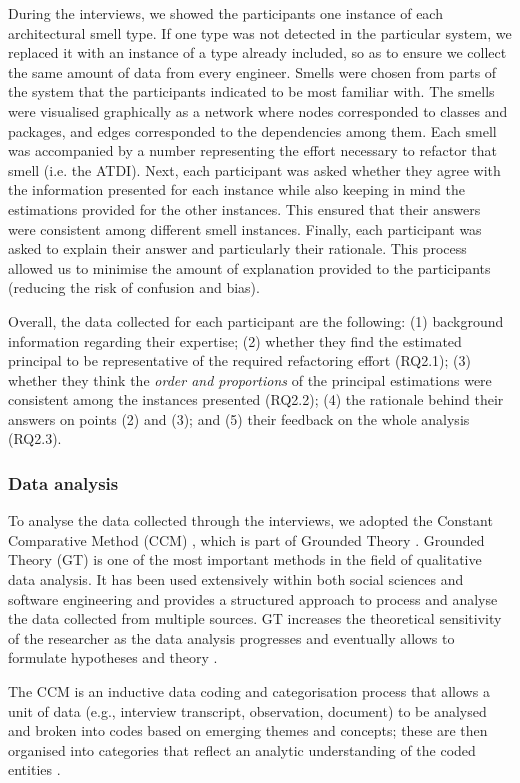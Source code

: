 During the interviews, we showed the participants one instance of each architectural smell type. If one type was not detected in the particular system, we replaced it with an instance of a type already included, so as to ensure we collect the same amount of data from every engineer. 
Smells were chosen from parts of the system that the participants indicated to be most familiar with.
The smells were visualised graphically as a network where nodes corresponded to classes and packages, and edges corresponded to the dependencies among them.
Each smell was accompanied by a number representing the effort necessary to refactor that smell (i.e. the ATDI).
Next, each participant was asked whether they agree with the information presented for each instance while also keeping in mind the estimations provided for the other instances.
This ensured that their answers were consistent among different smell instances.
Finally, each participant was asked to explain their answer and particularly their rationale.
This process allowed us to minimise the amount of explanation provided to the participants (reducing the risk of confusion and bias).

Overall, the data collected for each participant are the following: (1) background information regarding their expertise; (2) whether they find the estimated principal to be representative of the required refactoring effort (RQ2.1); (3) whether they think the \emph{order and proportions} of the principal estimations were consistent among the instances presented (RQ2.2); (4) the rationale behind their answers on points (2) and (3);  and (5) their feedback on the whole analysis (RQ2.3).


\subsubsection{Data analysis}
To analyse the data collected through the interviews, we adopted the Constant Comparative Method (CCM) \cite{Glaser2017,Boeije2002}, which is part of Grounded Theory \cite{Glaser1968}. Grounded Theory (GT) is one of the most important methods in the field of qualitative data analysis. 
It has been used extensively within both social sciences and software engineering and provides a structured approach to process and analyse the data collected from multiple sources.
GT increases the theoretical sensitivity of the researcher as the data analysis progresses and eventually allows to formulate hypotheses and theory \cite{Glaser1968}.

The CCM is an inductive data coding and categorisation process that allows a unit of data (e.g., interview transcript, observation, document) to be analysed and broken into codes based on emerging themes and concepts; these are then organised into categories that reflect an analytic understanding of the coded entities \cite{Mathison2005}.

